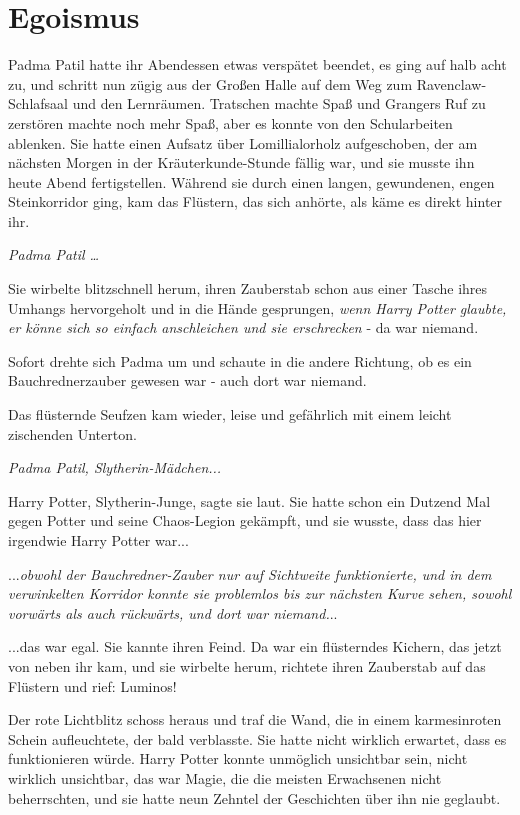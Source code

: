 \chapter{Egoismus}

Padma Patil hatte ihr Abendessen etwas verspätet beendet, es ging auf halb acht
zu, und schritt nun zügig aus der Großen Halle auf dem Weg zum
Ravenclaw-Schlafsaal und den Lernräumen. Tratschen machte Spaß und Grangers Ruf
zu zerstören machte noch mehr Spaß, aber es konnte von den Schularbeiten
ablenken. Sie hatte einen Aufsatz über Lomillialorholz aufgeschoben, der am
nächsten Morgen in der Kräuterkunde-Stunde fällig war, und sie musste ihn heute
Abend fertigstellen. Während sie durch einen langen, gewundenen, engen
Steinkorridor ging, kam das Flüstern, das sich anhörte, als käme es direkt
hinter ihr.

\glqq{}\emph{Padma Patil …}\grqq{}

Sie wirbelte blitzschnell herum, ihren Zauberstab schon aus einer Tasche ihres
Umhangs hervorgeholt und in die Hände gesprungen,\emph{ wenn Harry Potter
glaubte, er könne sich so einfach anschleichen und sie erschrecken} - da war
niemand.

Sofort drehte sich Padma um und schaute in die andere Richtung, ob es ein
Bauchrednerzauber gewesen war - auch dort war niemand.

Das flüsternde Seufzen kam wieder, leise und gefährlich mit einem leicht
zischenden Unterton.

\glqq{}\emph{Padma Patil, Slytherin-Mädchen...}\grqq{}

\glqq{}Harry Potter, Slytherin-Junge\grqq{}, sagte sie laut. Sie hatte schon ein
Dutzend Mal gegen Potter und seine Chaos-Legion gekämpft, und sie wusste, dass
das hier irgendwie Harry Potter war...

...\emph{obwohl der Bauchredner-Zauber nur auf Sichtweite funktionierte, und in
dem verwinkelten Korridor konnte sie problemlos bis zur nächsten Kurve sehen,
sowohl vorwärts als auch rückwärts, und dort war niemand.}..

...das war egal. Sie kannte ihren Feind. Da war ein flüsterndes Kichern, das
jetzt von neben ihr kam, und sie wirbelte herum, richtete ihren Zauberstab auf
das Flüstern und rief: \glqq{}Luminos!\grqq{}

Der rote Lichtblitz schoss heraus und traf die Wand, die in einem karmesinroten
Schein aufleuchtete, der bald verblasste. Sie hatte nicht wirklich erwartet,
dass es funktionieren würde. Harry Potter konnte unmöglich unsichtbar sein,
nicht wirklich unsichtbar, das war Magie, die die meisten Erwachsenen nicht
beherrschten, und sie hatte neun Zehntel der Geschichten über ihn nie geglaubt.

